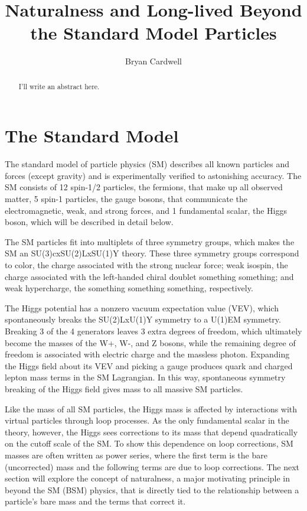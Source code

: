 \documentclass[12pt]{article}
\title{Naturalness and Long-lived Beyond the Standard Model Particles}
\author{Bryan Cardwell}
\begin{document}
\singlespacing

\maketitle

\begin{abstract}

I'll write an abstract here.

\end{abstract}

\newpage
\tableofcontents
\newpage
\doublespacing

\section{The Standard Model}
    The standard model of particle physics (SM) describes all known particles and forces (except gravity) and is experimentally verified to astonishing accuracy. The SM consists of 12 spin-1/2 particles, the fermions, that make up all observed matter, 5 spin-1 particles, the gauge bosons, that communicate the electromagnetic, weak, and strong forces, and 1 fundamental scalar, the Higgs boson, which will be described in detail below.
    
    The SM particles fit into multiplets of three symmetry groups, which makes the SM an SU(3)cxSU(2)LxSU(1)Y theory. These three symmetry groups correspond to color, the charge associated with the strong nuclear force; weak isospin, the charge associated with the left-handed chiral doublet something something; and weak hypercharge, the something something something, respectively. 

    The Higgs potential has a nonzero vacuum expectation value (VEV), which spontaneously breaks the SU(2)LxU(1)Y symmetry to a U(1)EM symmetry. Breaking 3 of the 4 generators leaves 3 extra degrees of freedom, which ultimately become the masses of the W+, W-, and Z bosons, while the remaining degree of freedom is associated with electric charge and the massless photon. Expanding the Higgs field about its VEV and picking a gauge produces quark and charged lepton mass terms in the SM Lagrangian. In this way, spontaneous symmetry breaking of the Higgs field gives mass to all massive SM particles.

    Like the mass of all SM particles, the Higgs mass is affected by interactions with virtual particles through loop processes. As the only fundamental scalar in the theory, however, the Higgs sees corrections to its mass that depend quadratically on the cutoff scale of the SM. To show this dependence on loop corrections, SM masses are often written as power series, where the first term is the bare (uncorrected) mass and the following terms are due to loop corrections. The next section will explore the concept of naturalness, a major motivating principle in beyond the SM (BSM) physics, that is directly tied to the relationship between a particle's bare mass and the terms that correct it.
\end{document}
